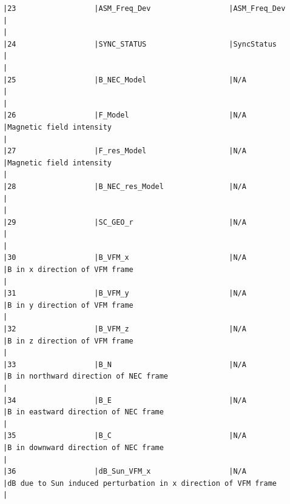 \begin{verbatim}
|23                  |ASM_Freq_Dev                  |ASM_Freq_Dev                  |                                                                                                    |
|24                  |SYNC_STATUS                   |SyncStatus                    |                                                                                                    |
|25                  |B_NEC_Model                   |N/A                           |                                                                                                    |
|26                  |F_Model                       |N/A                           |Magnetic field intensity                                                                            |
|27                  |F_res_Model                   |N/A                           |Magnetic field intensity                                                                            |
|28                  |B_NEC_res_Model               |N/A                           |                                                                                                    |
|29                  |SC_GEO_r                      |N/A                           |                                                                                                    |
|30                  |B_VFM_x                       |N/A                           |B in x direction of VFM frame                                                                       |
|31                  |B_VFM_y                       |N/A                           |B in y direction of VFM frame                                                                       |
|32                  |B_VFM_z                       |N/A                           |B in z direction of VFM frame                                                                       |
|33                  |B_N                           |N/A                           |B in northward direction of NEC frame                                                               |
|34                  |B_E                           |N/A                           |B in eastward direction of NEC frame                                                                |
|35                  |B_C                           |N/A                           |B in downward direction of NEC frame                                                                |
|36                  |dB_Sun_VFM_x                  |N/A                           |dB due to Sun induced perturbation in x direction of VFM frame                                      |

\end{verbatim}
